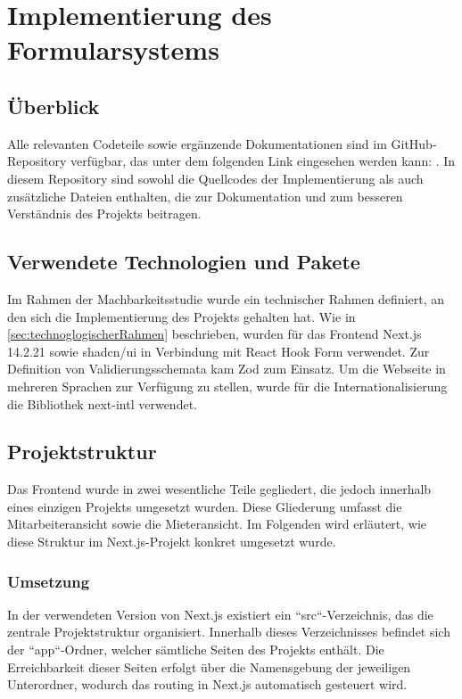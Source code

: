 \section{Implementierung des Formularsystems}

\subsection{Überblick}
Alle relevanten Codeteile sowie ergänzende Dokumentationen sind im GitHub-Repository verfügbar, das unter dem folgenden Link eingesehen werden kann: \cite{equilibriaSharingFrontend}. In diesem Repository sind sowohl die Quellcodes der Implementierung als auch zusätzliche Dateien enthalten, die zur Dokumentation und zum besseren Verständnis des Projekts beitragen.

\subsection{Verwendete Technologien und Pakete}
\label{sec:verwendeteTechnologien}
Im Rahmen der Machbarkeitsstudie wurde ein technischer Rahmen definiert, an den sich die Implementierung des Projekts gehalten hat. Wie in \ref{sec:technoglogischerRahmen} beschrieben, wurden für das Frontend Next.js 14.2.21 sowie shadcn/ui in Verbindung mit React Hook Form verwendet. Zur Definition von Validierungsschemata kam Zod zum Einsatz. Um die Webseite in mehreren Sprachen zur Verfügung zu stellen, wurde für die Internationalisierung die Bibliothek next-intl verwendet. 

\subsection{Projektstruktur}
Das Frontend wurde in zwei wesentliche Teile gegliedert, die jedoch innerhalb eines einzigen Projekts umgesetzt wurden. Diese Gliederung umfasst die Mitarbeiteransicht sowie die Mieteransicht. Im Folgenden wird erläutert, wie diese Struktur im Next.js-Projekt konkret umgesetzt wurde.

\subsubsection{Umsetzung}
In der verwendeten Version von Next.js existiert ein ``src``-Verzeichnis, das die zentrale Projektstruktur organisiert. Innerhalb dieses Verzeichnisses befindet sich der ``app``-Ordner, welcher sämtliche Seiten des Projekts enthält. Die Erreichbarkeit dieser Seiten erfolgt über die Namensgebung der jeweiligen Unterordner, wodurch das \gls{routing} in Next.js automatisch gesteuert wird.

